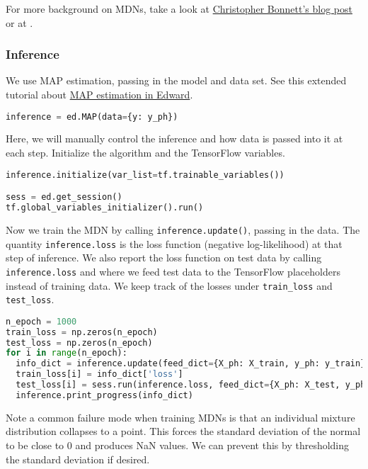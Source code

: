 For more background on MDNs, take a look at
\href{http://cbonnett.github.io/MDN.html}{Christopher Bonnett's blog
post} or at \citet{bishop1994mixture}.

\subsubsection{Inference}

We use MAP estimation, passing in the model and data set.
See this extended tutorial about
\href{/tutorials/map}{MAP estimation in Edward}.

\begin{lstlisting}[language=Python]
inference = ed.MAP(data={y: y_ph})
\end{lstlisting}

Here, we will manually control the inference and how data is passed
into it at each step.
Initialize the algorithm and the TensorFlow variables.

\begin{lstlisting}[language=Python]
inference.initialize(var_list=tf.trainable_variables())

sess = ed.get_session()
tf.global_variables_initializer().run()
\end{lstlisting}

Now we train the MDN by calling \texttt{inference.update()}, passing
in the data. The quantity \texttt{inference.loss} is the
loss function (negative log-likelihood) at that step of inference. We
also report the loss function on test data by calling
\texttt{inference.loss} and where we feed test data to the TensorFlow
placeholders instead of training data.
We keep track of the losses under \texttt{train\_loss} and \texttt{test\_loss}.

\begin{lstlisting}[language=Python]
n_epoch = 1000
train_loss = np.zeros(n_epoch)
test_loss = np.zeros(n_epoch)
for i in range(n_epoch):
  info_dict = inference.update(feed_dict={X_ph: X_train, y_ph: y_train})
  train_loss[i] = info_dict['loss']
  test_loss[i] = sess.run(inference.loss, feed_dict={X_ph: X_test, y_ph: y_test})
  inference.print_progress(info_dict)
\end{lstlisting}

Note a common failure mode when training MDNs is that an individual
mixture distribution collapses to a point. This forces the standard
deviation of the normal to be close to 0 and produces NaN values.
We can prevent this by thresholding the standard deviation if desired.

